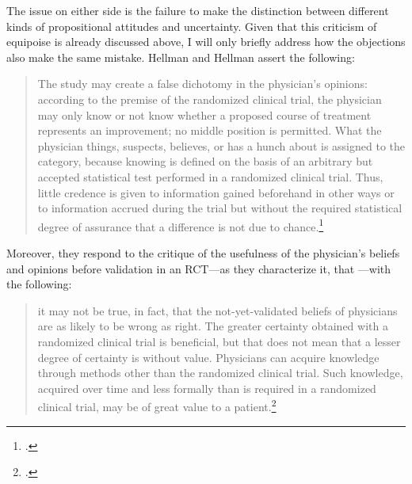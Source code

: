 \documentclass[letterpaper,notitlepage,12pt]{article}
\begin{document}
The issue on either side is the failure to make the distinction between
different kinds of propositional attitudes and uncertainty.
Given that this criticism of equipoise is already discussed above, I will only
briefly address how the objections also make the same mistake.
Hellman and Hellman assert the following: \blockquote{The study may create a
  false dichotomy in the physician's opinions: according to the premise of the
  randomized clinical trial, the physician may only know or not know whether a
  proposed course of treatment represents an improvement; no middle position is
  permitted. What the physician things, suspects, believes, or has a hunch about
  is assigned to the  category, because knowing is
  defined on the basis of an arbitrary but accepted statistical test performed
  in a randomized clinical trial. Thus, little credence is given to information
  gained beforehand in other ways or to information accrued during the trial but
  without the required statistical degree of assurance that a difference is not
due to chance.\footcite[p. 1586]{hellman_mice_1991}}
Moreover, they respond to the critique of the usefulness of the physician's
beliefs and opinions before validation in an RCT---as they characterize it, that
---with the following: \blockquote{it may not be true, in
  fact, that the not-yet-validated beliefs of physicians are as likely to be
  wrong as right. The greater certainty obtained with a randomized clinical
  trial is beneficial, but that does not mean that a lesser degree of certainty
  is without value. Physicians can acquire knowledge through methods other than
  the randomized clinical trial. Such knowledge, acquired over time and less
  formally than is required in a randomized clinical trial, may be of great
value to a patient.\footcite[p. 1587]{hellman_mice_1991}}
\end{document}
